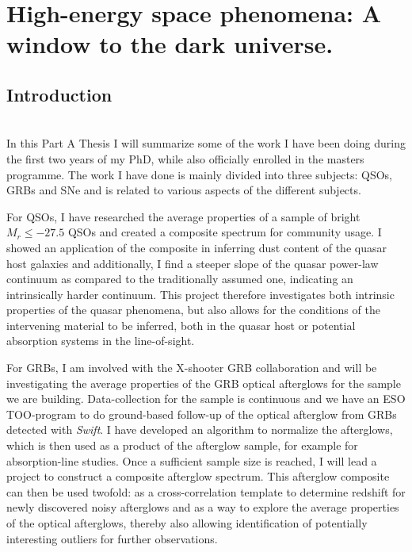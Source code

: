%
\chapter{High-energy space phenomena: A window to the dark universe.}
\section{Introduction}
\label{sec:intro}

 \\

In this Part A Thesis I will summarize some of the work I have been doing during
the
first two years of my PhD, while also officially enrolled in the masters
programme. The work I have done is mainly divided into three subjects: QSOs,
GRBs and SNe and is related to various aspects of the different subjects. 

For QSOs, I have researched the average properties of a sample of bright $M_{r}
\leq -27.5$ QSOs and created a composite spectrum for community usage. I showed
an application of the composite in inferring dust content of the quasar host
galaxies and additionally, I find a steeper slope of the quasar power-law
continuum
as compared to the traditionally assumed one, indicating an
intrinsically harder
continuum. This project therefore investigates both
intrinsic properties of the
quasar phenomena, but also allows for the conditions
of the intervening material to be
inferred, both in the quasar host or potential
absorption systems in the
line-of-sight.

For GRBs, I am involved with the X-shooter GRB collaboration and will be
investigating the average properties of the GRB optical afterglows for the
sample we are building. Data-collection for the sample is continuous and we have
an ESO TOO-program to do ground-based follow-up of the optical afterglow from
GRBs detected with \textit{Swift}.  I have developed an algorithm to normalize
the afterglows, which is then used  as a product of the afterglow sample, for
example for absorption-line studies. Once a sufficient sample size is
reached, I will lead a project to construct a composite afterglow spectrum. This
afterglow composite can then be used twofold: as a cross-correlation template to
determine redshift for newly discovered noisy afterglows and as a way to
explore
the average properties of the optical afterglows, thereby also allowing
identification of potentially interesting outliers for further observations. 

